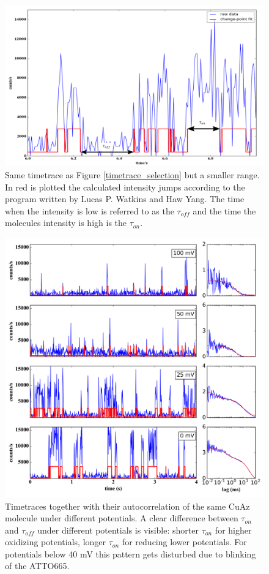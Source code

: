 \documentclass[twoside,single]{lion-msc}
\begin{document}
\begin{figure}[ht!]
\centering
\includegraphics[width=\textwidth]{on_off_test1}
\caption{Same timetrace as Figure \ref{timetrace_selection} but a smaller range. In red is plotted the calculated intensity jumps according to the program written by Lucas P. Watkins and Haw Yang. The time when the intensity is low is referred to as the $\tau_{off}$ and the time the molecules intensity is high is the $\tau_{on}$.}
\label{on_off_times}
\end{figure}

\begin{figure}[ht!]
\centering
\includegraphics[width=1\textwidth]{plots_timetraces_diff_pot}
\caption{Timetraces together with their autocorrelation of the same CuAz molecule under different potentials. A clear difference between $\tau_{on}$ and $\tau_{off}$ under different potentials is visible: shorter $\tau_{on}$ for higher oxidizing potentials, longer $\tau_{on}$ for reducing lower potentials. For potentials below 40 mV this pattern gets disturbed due to blinking of the ATTO665.}
\label{plots_timetraces_diff_pot}
\end{figure}
\end{document}
